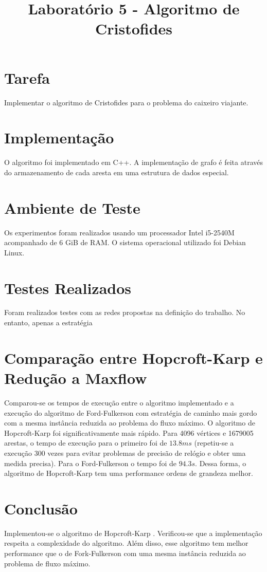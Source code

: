 \documentclass{iiufrgs}
\title{Laboratório 5 - Algoritmo de Cristofides}
\author{}{Thiago Bell}
\begin{document}
\maketitle

\setcounter{chapter}{1}

\section{Tarefa}
Implementar o algoritmo de Cristofides para o problema do caixeiro viajante.

\section{Implementaç\~ao}
O algoritmo foi implementado em C++. A implementação de grafo é feita através do
armazenamento de cada aresta em uma estrutura de dados especial.


\section{Ambiente de Teste}
Os experimentos foram realizados usando um processador Intel  i5-2540M 
acompanhado de 6 GiB de RAM. 
O sistema operacional utilizado foi Debian Linux.

\section{Testes Realizados}
Foram realizados testes com as redes propostas na definição do trabalho.
No entanto, apenas a estratégia

\section{Comparação entre Hopcroft-Karp e Redução a Maxflow}
Comparou-se os tempos de execução entre o algoritmo implementado e a execução do algoritmo de Ford-Fulkerson com estratégia de caminho mais gordo com a mesma instância reduzida ao
problema do fluxo máximo.
O algoritmo de Hopcroft-Karp foi significativamente mais rápido. Para 4096 vértices e 1679005 arestas, o tempo de execução para o primeiro foi de $13.8 ms$ (repetiu-se a execução 300 vezes 
para evitar problemas de precisão de relógio e obter uma medida precisa). Para o Ford-Fulkerson o tempo foi de $94.3s$. Dessa forma, o algoritmo de Hopcroft-Karp tem uma performance ordens
de grandeza melhor.


\section{Conclus\~ao}
Implementou-se o algoritmo de Hopcroft-Karp . Verificou-se que a implementação respeita a
complexidade do algoritmo. Além disso, esse algoritmo tem melhor performance que o de Fork-Fulkerson com uma mesma instância reduzida ao problema de fluxo máximo.
\end{document}
